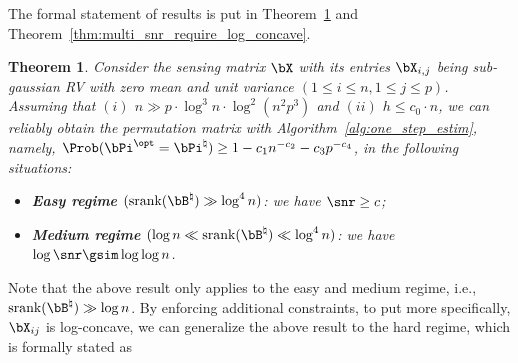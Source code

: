 \documentclass[11pt]{article}
\newtheorem{theorem}{Theorem}
\def \bPitrue {\bPi^{\natural}}
\def \bBtrue {\bB^{\natural}}
\def \bPiopt {\bPi^{\opt}}
\def\srank#1{\textup{srank}(#1)}
\begin{document}
The formal statement of results is put in Theorem~\ref{thm:multi_snr_require_general_sub_gauss}
and Theorem~\ref{thm:multi_snr_require_log_concave}.


\begin{theorem}
\label{thm:multi_snr_require_general_sub_gauss}
Consider the sensing matrix $\bX$ with its entries
$\bX_{i, j}$ being sub-gaussian RV with zero mean and unit variance
$(1\leq i \leq n, 1\leq j \leq p)$.
Assuming that $(i)$ $n\gg p\cdot \log^3 n\cdot \log^2(n^2 p^3)$
and $(ii)$ $h\leq c_0\cdot  n$,
we can reliably obtain the permutation matrix with Algorithm~\ref{alg:one_step_estim}, namely,
$\Prob(\bPiopt = \bPitrue) \geq 1 - c_1 n^{-c_2} -c_3p^{-c_4}$,
in the following situations:
\begin{itemize}
\item
\textbf{Easy regime $(\srank{\bBtrue} \gg \log^4 n)$}: we have $\snr \geq c$;

\item
\textbf{Medium regime $(\log n \ll \srank{\bBtrue} \ll \log^4 n)$}:
we have $\log \snr \gsim \log \log n$.

\end{itemize}

\end{theorem}


Note that the above result only applies to the easy and medium regime, i.e.,
$\srank{\bBtrue} \gg \log n$. By enforcing additional
constraints, to put more specifically, $\bX_{ij}$ is log-concave,
we can generalize the above result to the hard regime, which is formally stated as
\end{document}

